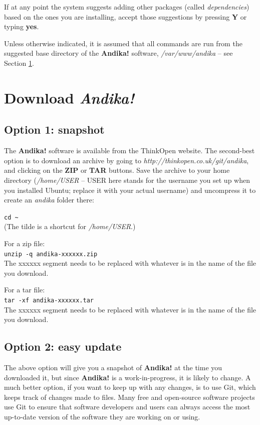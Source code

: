 \documentclass[a4paper,10pt, oneside]{book}
\begin{document}
If at any point the system suggests adding other packages (called \textit{dependencies}) based on the ones you are installing, accept those suggestions by pressing \textbf{Y} or typing \textbf{yes}.

Unless otherwise indicated, it is assumed that all commands are run from the suggested base directory of the \textbf{Andika!} software, \textit{/var/www/andika} -- see Section \ref{s:download}.


\section{Download \textit{Andika!}}
\label{s:download}

\subsection{Option 1: snapshot}

The \textbf{Andika!} software is available from the ThinkOpen website.  The second-best option is to download an archive by going to \textit{http://thinkopen.co.uk/git/andika}, and clicking on the \textbf{ZIP} or \textbf{TAR} buttons.  Save the archive to your home directory (\textit{/home/USER} -- USER here stands for the username you set up when you installed Ubuntu; replace it with your actual username) and uncompress it to create an \textit{andika} folder there:

\verb|cd ~|\\
(The tilde is a shortcut for \textit{/home/USER}.)

For a zip file:\\
\verb|unzip -q andika-xxxxxx.zip|\\
The xxxxxx segment needs to be replaced with whatever is in the name of the file you download.

For a tar file:\\
\verb|tar -xf andika-xxxxxx.tar|\\
The xxxxxx segment needs to be replaced with whatever is in the name of the file you download.

\subsection{Option 2: easy update}

The above option will give you a snapshot of \textbf{Andika!} at the time you downloaded it, but since \textbf{Andika!} is a work-in-progress, it is likely to change.  A much better option, if you want to keep up with any changes, is to use Git, which keeps track of changes made to files.  Many free and open-source software projects use Git to ensure that software developers and users can always access the most up-to-date version of the software they are working on or using.
\end{document}
